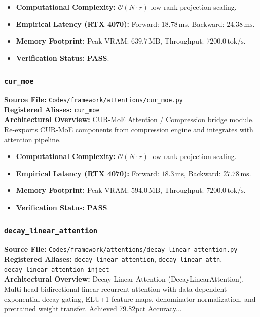 \begin{itemize}
    \item \textbf{Computational Complexity:} $\mathcal{O}(N \cdot r)$ low-rank projection scaling.
    \item \textbf{Empirical Latency (RTX 4070):} Forward: $18.78\,\text{ms}$, Backward: $24.38\,\text{ms}$.
    \item \textbf{Memory Footprint:} Peak VRAM: $639.7\,\text{MB}$, Throughput: $7200.0\,\text{tok/s}$.
    \item \textbf{Verification Status:} \textbf{PASS}.
\end{itemize}

\subsubsection{\texttt{cur\_moe}}
\textbf{Source File:} \texttt{Codes/framework/attentions/cur\_moe.py} \\
\textbf{Registered Aliases:} \texttt{cur\_moe} \\
\textbf{Architectural Overview:} CUR-MoE Attention / Compression bridge module. Re-exports CUR-MoE components from compression engine and integrates with attention pipeline.

\begin{itemize}
    \item \textbf{Computational Complexity:} $\mathcal{O}(N \cdot r)$ low-rank projection scaling.
    \item \textbf{Empirical Latency (RTX 4070):} Forward: $18.3\,\text{ms}$, Backward: $27.78\,\text{ms}$.
    \item \textbf{Memory Footprint:} Peak VRAM: $594.0\,\text{MB}$, Throughput: $7200.0\,\text{tok/s}$.
    \item \textbf{Verification Status:} \textbf{PASS}.
\end{itemize}

\subsubsection{\texttt{decay\_linear\_attention}}
\textbf{Source File:} \texttt{Codes/framework/attentions/decay\_linear\_attention.py} \\
\textbf{Registered Aliases:} \texttt{decay\_linear\_attention}, \texttt{decay\_linear\_attn}, \texttt{decay\_linear\_attention\_inject} \\
\textbf{Architectural Overview:} Decay Linear Attention (DecayLinearAttention). Multi-head bidirectional linear recurrent attention with data-dependent exponential decay gating, ELU+1 feature maps, denominator normalization, and pretrained weight transfer. Achieved 79.82pct Accuracy...

